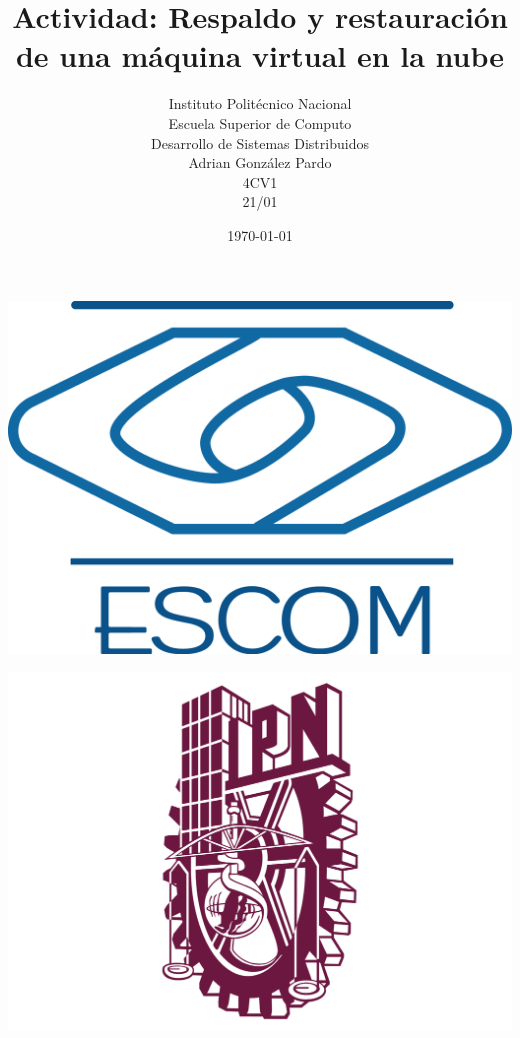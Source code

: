 \documentclass[10pt,executivepaper]{article}
\title{Actividad: Respaldo y restauración de una máquina virtual en la nube}
\author{Instituto Politécnico Nacional\\Escuela Superior de Computo\\Desarrollo de Sistemas Distribuidos\\Adrian González Pardo\\4CV1\\21/01}
\date{\today}
\begin{document}
\begin{minipage}{0.4\textwidth}
	\begin{flushleft}
		\includegraphics[scale = 0.05]{logoescom.png}
	\end{flushleft}
\end{minipage}
\begin{minipage}{0.51\textwidth}
	\begin{flushright}
		\includegraphics[scale = 0.055]{logoipn.png}
	\end{flushright}
\end{minipage}
\end{document}
